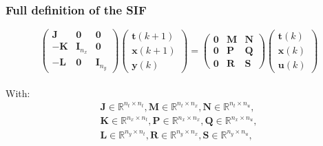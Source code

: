 \addtocounter{framenumber}{-1}
\begin{frame}
	\frametitle{Full definition of the SIF}
	\begin{equation} \label{sifdef}
		\begin{pmatrix}
			\boldsymbol{J} & \boldsymbol{0} & \boldsymbol{0} \\
			\boldsymbol{-K} & \boldsymbol{I}_{n_x} & \boldsymbol{0} \\
			\boldsymbol{-L} & \boldsymbol{0} & \boldsymbol{I}_{n_y} 
		\end{pmatrix}
		\begin{pmatrix}
			\boldsymbol{t} (k+1)  \\
			\boldsymbol{x} (k+1)  \\
			\boldsymbol{y} (k) 
		\end{pmatrix}
		=
		\begin{pmatrix}
			\boldsymbol{0} & \boldsymbol{M} & \boldsymbol{N} \\
			\boldsymbol{0} & \boldsymbol{P} & \boldsymbol{Q} \\
			\boldsymbol{0} & \boldsymbol{R} & \boldsymbol{S} 
		\end{pmatrix}
		\begin{pmatrix}
			\boldsymbol{t} (k)  \\
			\boldsymbol{x} (k)  \\
			\boldsymbol{u} (k) 
		\end{pmatrix}
	\end{equation}
	\\
	\vspace{10pt}
	With: \\
	\begin{eqnarray}
		\boldsymbol{J} \in \mathbb{R}^{n_t \times n_t},\boldsymbol{M} \in \mathbb{R}^{n_t \times n_x},\boldsymbol{N} \in \mathbb{R}^{n_t \times n_u}, \nonumber \\
		\boldsymbol{K} \in \mathbb{R}^{n_x \times n_t},\boldsymbol{P} \in \mathbb{R}^{n_x \times n_x},\boldsymbol{Q} \in \mathbb{R}^{n_x \times n_u}, \\
		\boldsymbol{L} \in \mathbb{R}^{n_y \times n_t},\boldsymbol{R} \in \mathbb{R}^{n_y \times n_x},\boldsymbol{S} \in \mathbb{R}^{n_y \times n_u}, \nonumber \\
	\end{eqnarray}

\end{frame}

